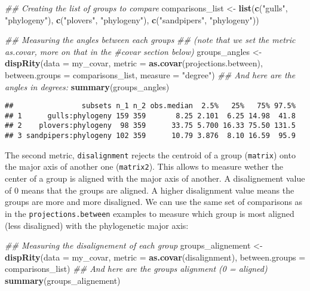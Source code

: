 \documentclass[
]{book}
\newenvironment{Shaded}{\begin{snugshade}}{\end{snugshade}}
\newcommand{\CommentTok}[1]{\textcolor[rgb]{0.56,0.35,0.01}{\textit{#1}}}
\newcommand{\DataTypeTok}[1]{\textcolor[rgb]{0.13,0.29,0.53}{#1}}
\newcommand{\KeywordTok}[1]{\textcolor[rgb]{0.13,0.29,0.53}{\textbf{#1}}}
\newcommand{\NormalTok}[1]{#1}
\newcommand{\StringTok}[1]{\textcolor[rgb]{0.31,0.60,0.02}{#1}}
\begin{document}
\begin{Shaded}
\begin{Highlighting}[]
\CommentTok{\#\# Creating the list of groups to compare}
\NormalTok{comparisons\_list \textless{}{-}}\StringTok{ }\KeywordTok{list}\NormalTok{(}\KeywordTok{c}\NormalTok{(}\StringTok{"gulls"}\NormalTok{, }\StringTok{"phylogeny"}\NormalTok{),}
                         \KeywordTok{c}\NormalTok{(}\StringTok{"plovers"}\NormalTok{, }\StringTok{"phylogeny"}\NormalTok{),}
                         \KeywordTok{c}\NormalTok{(}\StringTok{"sandpipers"}\NormalTok{, }\StringTok{"phylogeny"}\NormalTok{))}

\CommentTok{\#\# Measuring the angles between each groups}
\CommentTok{\#\# (note that we set the metric as.covar, more on that in the \#covar section below)}
\NormalTok{groups\_angles \textless{}{-}}\StringTok{ }\KeywordTok{dispRity}\NormalTok{(}\DataTypeTok{data =}\NormalTok{ my\_covar,}
                          \DataTypeTok{metric =} \KeywordTok{as.covar}\NormalTok{(projections.between),}
                          \DataTypeTok{between.groups =}\NormalTok{ comparisons\_list,}
                          \DataTypeTok{measure =} \StringTok{"degree"}\NormalTok{)}
\CommentTok{\#\# And here are the angles in degrees:}
\KeywordTok{summary}\NormalTok{(groups\_angles)}
\end{Highlighting}
\end{Shaded}

\begin{verbatim}
##                subsets n_1 n_2 obs.median  2.5%   25%   75% 97.5%
## 1      gulls:phylogeny 159 359       8.25 2.101  6.25 14.98  41.8
## 2    plovers:phylogeny  98 359      33.75 5.700 16.33 75.50 131.5
## 3 sandpipers:phylogeny 102 359      10.79 3.876  8.10 16.59  95.9
\end{verbatim}

The second metric, \texttt{disalignment} rejects the centroid of a group (\texttt{matrix}) onto the major axis of another one (\texttt{matrix2}).
This allows to measure wether the center of a group is aligned with the major axis of another.
A disalignement value of 0 means that the groups are aligned. A higher disalignment value means the groups are more and more disaligned.
We can use the same set of comparisons as in the \texttt{projections.between} examples to measure which group is most aligned (less disaligned) with the phylogenetic major axis:

\begin{Shaded}
\begin{Highlighting}[]
\CommentTok{\#\# Measuring the disalignement of each group}
\NormalTok{groups\_alignement \textless{}{-}}\StringTok{ }\KeywordTok{dispRity}\NormalTok{(}\DataTypeTok{data =}\NormalTok{ my\_covar,}
                              \DataTypeTok{metric =} \KeywordTok{as.covar}\NormalTok{(disalignment),}
                              \DataTypeTok{between.groups =}\NormalTok{ comparisons\_list)}
\CommentTok{\#\# And here are the groups alignment (0 = aligned)}
\KeywordTok{summary}\NormalTok{(groups\_alignement)}
\end{Highlighting}
\end{Shaded}
\end{document}
